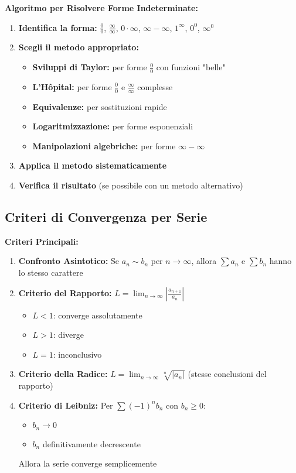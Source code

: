 \begin{strategia}
\textbf{Algoritmo per Risolvere Forme Indeterminate:}
\begin{enumerate}
    \item \textbf{Identifica la forma:} $\frac{0}{0}$, $\frac{\infty}{\infty}$, $0 \cdot \infty$, $\infty - \infty$, $1^{\infty}$, $0^0$, $\infty^0$
    \item \textbf{Scegli il metodo appropriato:}
    \begin{itemize}
        \item \textbf{Sviluppi di Taylor:} per forme $\frac{0}{0}$ con funzioni "belle"
        \item \textbf{L'Hôpital:} per forme $\frac{0}{0}$ e $\frac{\infty}{\infty}$ complesse
        \item \textbf{Equivalenze:} per sostituzioni rapide
        \item \textbf{Logaritmizzazione:} per forme esponenziali
        \item \textbf{Manipolazioni algebriche:} per forme $\infty - \infty$
    \end{itemize}
    \item \textbf{Applica il metodo sistematicamente}
    \item \textbf{Verifica il risultato} (se possibile con un metodo alternativo)
\end{enumerate}
\end{strategia}

\subsection{Criteri di Convergenza per Serie}

\begin{info}
\textbf{Criteri Principali:}
\begin{enumerate}
    \item \textbf{Confronto Asintotico:} Se $a_n \sim b_n$ per $n \to \infty$, allora $\sum a_n$ e $\sum b_n$ hanno lo stesso carattere
    \item \textbf{Criterio del Rapporto:} $L = \lim_{n \to \infty} \left|\frac{a_{n+1}}{a_n}\right|$
        \begin{itemize}
            \item $L < 1$: converge assolutamente
            \item $L > 1$: diverge
            \item $L = 1$: inconclusivo
        \end{itemize}
    \item \textbf{Criterio della Radice:} $L = \lim_{n \to \infty} \sqrt[n]{|a_n|}$ (stesse conclusioni del rapporto)
    \item \textbf{Criterio di Leibniz:} Per $\sum (-1)^n b_n$ con $b_n \geq 0$:
        \begin{itemize}
            \item $b_n \to 0$
            \item $b_n$ definitivamente decrescente
        \end{itemize}
        Allora la serie converge semplicemente
\end{enumerate}
\end{info}

